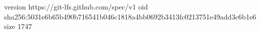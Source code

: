 version https://git-lfs.github.com/spec/v1
oid sha256:5031e6b65b490b716541b046c1818a4bb0692b3413fc0213751e49add3c6b1e6
size 1747
